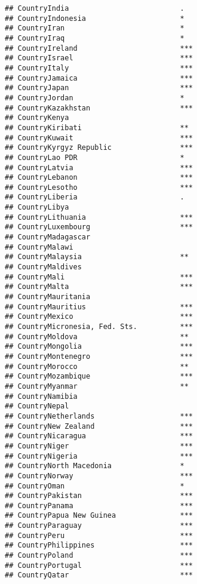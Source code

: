 \documentclass[
]{article}
\begin{document}
\begin{verbatim}
## CountryIndia                          .  
## CountryIndonesia                      *  
## CountryIran                           *  
## CountryIraq                           *  
## CountryIreland                        ***
## CountryIsrael                         ***
## CountryItaly                          ***
## CountryJamaica                        ***
## CountryJapan                          ***
## CountryJordan                         *  
## CountryKazakhstan                     ***
## CountryKenya                             
## CountryKiribati                       ** 
## CountryKuwait                         ***
## CountryKyrgyz Republic                ***
## CountryLao PDR                        *  
## CountryLatvia                         ***
## CountryLebanon                        ***
## CountryLesotho                        ***
## CountryLiberia                        .  
## CountryLibya                             
## CountryLithuania                      ***
## CountryLuxembourg                     ***
## CountryMadagascar                        
## CountryMalawi                            
## CountryMalaysia                       ** 
## CountryMaldives                          
## CountryMali                           ***
## CountryMalta                          ***
## CountryMauritania                        
## CountryMauritius                      ***
## CountryMexico                         ***
## CountryMicronesia, Fed. Sts.          ***
## CountryMoldova                        ** 
## CountryMongolia                       ***
## CountryMontenegro                     ***
## CountryMorocco                        ** 
## CountryMozambique                     ***
## CountryMyanmar                        ** 
## CountryNamibia                           
## CountryNepal                             
## CountryNetherlands                    ***
## CountryNew Zealand                    ***
## CountryNicaragua                      ***
## CountryNiger                          ***
## CountryNigeria                        ***
## CountryNorth Macedonia                *  
## CountryNorway                         ***
## CountryOman                           *  
## CountryPakistan                       ***
## CountryPanama                         ***
## CountryPapua New Guinea               ***
## CountryParaguay                       ***
## CountryPeru                           ***
## CountryPhilippines                    ***
## CountryPoland                         ***
## CountryPortugal                       ***
## CountryQatar                          ***

\end{verbatim}
\end{document}
